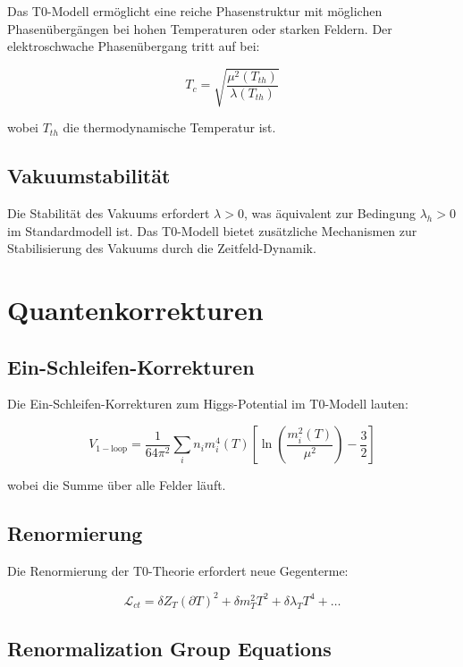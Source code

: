 \documentclass[12pt,a4paper]{report}
\begin{document}
Das T0-Modell ermöglicht eine reiche Phasenstruktur mit möglichen Phasenübergängen bei hohen Temperaturen oder starken Feldern. Der elektroschwache Phasenübergang tritt auf bei:

\begin{equation}
	T_c = \sqrt{\frac{\mu^2(T_{th})}{\lambda(T_{th})}}
\end{equation}

wobei $T_{th}$ die thermodynamische Temperatur ist.

\subsection{Vakuumstabilität}

Die Stabilität des Vakuums erfordert $\lambda > 0$, was äquivalent zur Bedingung $\lambda_h > 0$ im Standardmodell ist. Das T0-Modell bietet zusätzliche Mechanismen zur Stabilisierung des Vakuums durch die Zeitfeld-Dynamik.

\section{Quantenkorrekturen}

\subsection{Ein-Schleifen-Korrekturen}

Die Ein-Schleifen-Korrekturen zum Higgs-Potential im T0-Modell lauten:

\begin{equation}
	V_{1-\text{loop}} = \frac{1}{64\pi^2} \sum_i n_i m_i^4(T) \left[\ln\left(\frac{m_i^2(T)}{\mu^2}\right) - \frac{3}{2}\right]
\end{equation}

wobei die Summe über alle Felder läuft.

\subsection{Renormierung}

Die Renormierung der T0-Theorie erfordert neue Gegenterme:

\begin{equation}
	\mathcal{L}_{ct} = \delta Z_T (\partial T)^2 + \delta m_T^2 T^2 + \delta\lambda_T T^4 + \ldots
\end{equation}

\subsection{Renormalization Group Equations}
\end{document}
